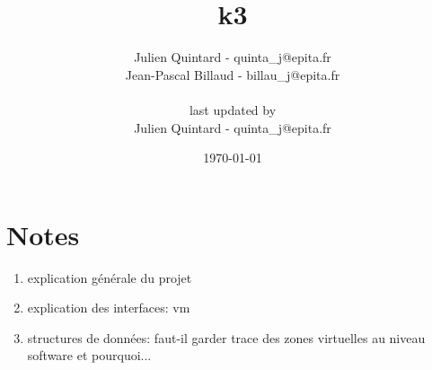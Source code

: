 \documentclass[10pt,a4wide]{article}
\title{k3}
\author{Julien Quintard - \small{quinta\_j@epita.fr} \\
        Jean-Pascal Billaud - \small{billau\_j@epita.fr} \\ \\
	\small{last updated by} \\
	Julien Quintard - \small{quinta\_j@epita.fr}}
\date{\today}
\begin{document}
\maketitle

\section{Notes}

\begin{enumerate}

\item explication g\'en\'erale du projet

\item explication des interfaces: vm

\item structures de donn\'ees: faut-il garder trace des zones
      virtuelles au niveau software et pourquoi...

\end{enumerate}
\end{document}
